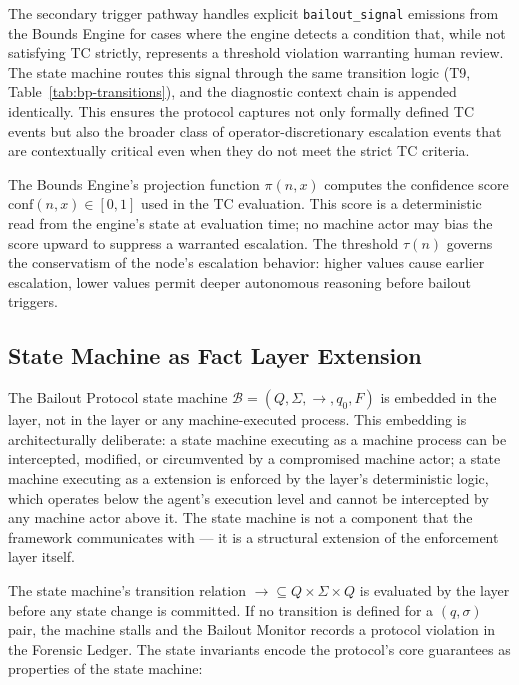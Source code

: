 The secondary trigger pathway handles explicit \texttt{bailout\_signal}
emissions from the Bounds Engine for cases where the engine detects a
condition that, while not satisfying TC strictly, represents a threshold
violation warranting human review.  The state machine routes this signal
through the same transition logic (T9, Table~\ref{tab:bp-transitions}), and the
diagnostic context chain is appended identically.  This ensures the protocol
captures not only formally defined TC events but also the broader class of
operator-discretionary escalation events that are contextually critical even
when they do not meet the strict TC criteria.

The Bounds Engine's projection function $\pi(n, x)$ computes the confidence
score $\text{conf}(n, x) \in [0, 1]$ used in the TC evaluation.  This score
is a deterministic read from the engine's state at evaluation time; no machine
actor may bias the score upward to suppress a warranted escalation.  The
threshold $\tau(n)$ governs the conservatism of the node's escalation
behavior: higher values cause earlier escalation, lower values permit deeper
autonomous reasoning before bailout triggers.

\subsection{State Machine as Fact Layer Extension}
\label{sec:bailout-state-machine}

The Bailout Protocol state machine
$\mathcal{B} = (Q, \Sigma, \rightarrow, q_0, F)$ is embedded in the
\factLayer{} layer, not in the \boundsLayer{} layer or any machine-executed process.
This embedding is architecturally deliberate: a state machine executing as
a machine process can be intercepted, modified, or circumvented by a
compromised machine actor; a state machine executing as a \factLayer{}
extension is enforced by the layer's deterministic logic, which operates below
the agent's execution level and cannot be intercepted by any machine actor
above it.  The state machine is not a component that the framework
communicates with --- it is a structural extension of the enforcement layer
itself.

The state machine's transition relation $\rightarrow \subseteq Q \times \Sigma \times Q$
is evaluated by the \factLayer{} layer before any state change is committed.  If
no transition is defined for a $(q, \sigma)$ pair, the machine stalls and the
Bailout Monitor records a protocol violation in the Forensic Ledger.  The
state invariants encode the protocol's core guarantees as properties of the
state machine:

